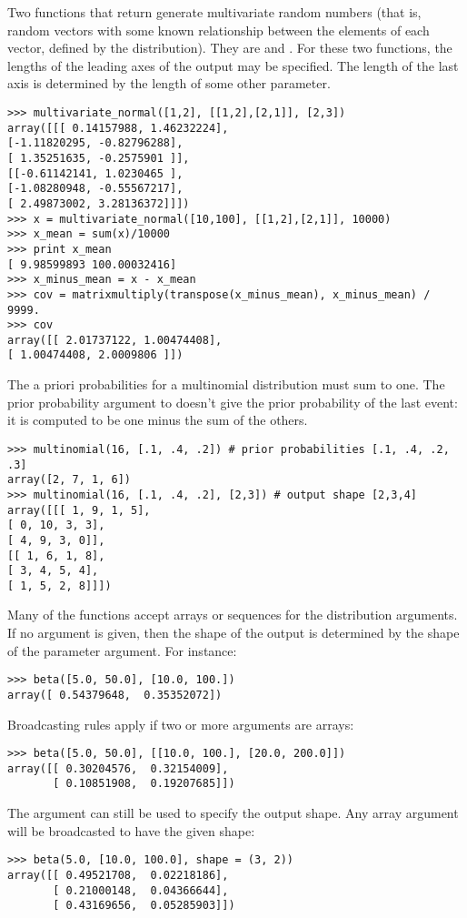 Two functions that return generate multivariate random numbers (that is, random
vectors with some known relationship between the elements of each vector,
defined by the distribution). They are  and
. For these two functions, the lengths of the leading
axes of the output may be specified. The length of the last axis is determined
by the length of some other parameter.
\begin{verbatim}
>>> multivariate_normal([1,2], [[1,2],[2,1]], [2,3])
array([[[ 0.14157988, 1.46232224],
[-1.11820295, -0.82796288],
[ 1.35251635, -0.2575901 ]],
[[-0.61142141, 1.0230465 ],
[-1.08280948, -0.55567217],
[ 2.49873002, 3.28136372]]])
>>> x = multivariate_normal([10,100], [[1,2],[2,1]], 10000)
>>> x_mean = sum(x)/10000
>>> print x_mean
[ 9.98599893 100.00032416]
>>> x_minus_mean = x - x_mean
>>> cov = matrixmultiply(transpose(x_minus_mean), x_minus_mean) / 9999.
>>> cov
array([[ 2.01737122, 1.00474408],
[ 1.00474408, 2.0009806 ]])
\end{verbatim}
The a priori probabilities for a multinomial distribution must sum to one. The
prior probability argument to  doesn't give the prior
probability of the last event: it is computed to be one minus the sum of the
others.
\begin{verbatim}
>>> multinomial(16, [.1, .4, .2]) # prior probabilities [.1, .4, .2, .3]
array([2, 7, 1, 6])
>>> multinomial(16, [.1, .4, .2], [2,3]) # output shape [2,3,4]
array([[[ 1, 9, 1, 5],
[ 0, 10, 3, 3],
[ 4, 9, 3, 0]],
[[ 1, 6, 1, 8],
[ 3, 4, 5, 4],
[ 1, 5, 2, 8]]])
\end{verbatim}
Many of the functions accept arrays or sequences for the distribution
arguments. If no  argument is given, then the shape of the output is
determined by the shape of the parameter argument. For instance:
\begin{verbatim}
>>> beta([5.0, 50.0], [10.0, 100.])
array([ 0.54379648,  0.35352072])
\end{verbatim}
Broadcasting rules apply if two or more arguments are arrays:
\begin{verbatim}
>>> beta([5.0, 50.0], [[10.0, 100.], [20.0, 200.0]])
array([[ 0.30204576,  0.32154009],
       [ 0.10851908,  0.19207685]])
\end{verbatim}
The  argument can still be used to specify the output shape. Any
array argument will be broadcasted to have the given shape:
\begin{verbatim}
>>> beta(5.0, [10.0, 100.0], shape = (3, 2))
array([[ 0.49521708,  0.02218186],
       [ 0.21000148,  0.04366644],
       [ 0.43169656,  0.05285903]])
\end{verbatim}
